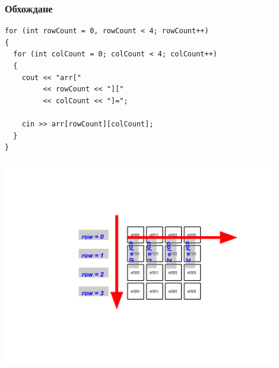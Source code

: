 \documentclass{beamer}
\begin{document}
\begin{frame}[fragile]
\frametitle{Обхождане}

\begin{flushleft}

\begin{lstlisting}
for (int rowCount = 0, rowCount < 4; rowCount++)
{
  for (int colCount = 0; colCount < 4; colCount++)
  {
    cout << "arr["
         << rowCount << "]["
         << colCount << "]="; 
    
    cin >> arr[rowCount][colCount];
  }
}
\end{lstlisting}
\end{flushleft}

\vspace*{-100pt}
\hspace*{-40pt}
\includegraphics[width=12cm]{images/matr_iter_0} 

\end{frame}
\end{document}
